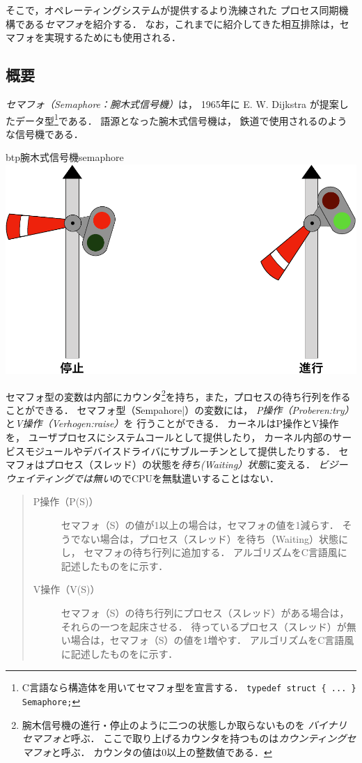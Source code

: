そこで，オペレーティングシステムが提供するより洗練された
プロセス同期機構である\emph{セマフォ}を紹介する．
なお，これまでに紹介してきた相互排除は，セマフォを実現するためにも使用される．

\subsection{概要}
\emph{セマフォ（Semaphore：腕木式信号機）}は，
1965年に E. W. Dijkstra が提案したデータ型\footnote{
  C言語なら構造体を用いてセマフォ型を宣言する．
  \texttt{typedef struct \{ ... \} Semaphore;}
}である．
語源となった腕木式信号機は，
鉄道で使用されるのような信号機である．

\begin{myfig}{btp}{腕木式信号機}{semaphore}
  \includegraphics[scale=0.4]{Fig/semaphore-crop.pdf}
\end{myfig}

セマフォ型の変数は内部にカウンタ\footnote{
  腕木信号機の進行・停止のように二つの状態しか取らないものを
  \emph{バイナリセマフォと}呼ぶ．
  ここで取り上げるカウンタを持つものは\emph{カウンティングセマフォ}と呼ぶ．
  カウンタの値は0以上の整数値である．
}を持ち，また，プロセスの待ち行列を作ることができる．
セマフォ型（\|Sempahore|）の変数には，
\emph{P操作（Proberen:try）}と\emph{V操作（Verhogen:raise）}を
行うことができる．
カーネルはP操作とV操作を，
ユーザプロセスにシステムコールとして提供したり，
カーネル内部のサービスモジュールやデバイスドライバにサブルーチンとして提供したりする．
セマフォはプロセス（スレッド）の状態を\emph{待ち(Waiting）状態}に変える．
  \emph{ビジーウェイティングでは無い}のでCPUを無駄遣いすることはない．

\begin{quote}
  \begin{description}
  \item[P操作（P(S)）]
    セマフォ（S）の値が1以上の場合は，セマフォの値を1減らす．
    そうでない場合は，プロセス（スレッド）を待ち（Waiting）状態にし，
    セマフォの待ち行列に追加する．
    アルゴリズムをC言語風に記述したものをに示す．
  \item[V操作（V(S)）]
    セマフォ（S）の待ち行列にプロセス（スレッド）がある場合は，
    それらの一つを起床させる．
    待っているプロセス（スレッド）が無い場合は，セマフォ（S）の値を1増やす．
    アルゴリズムをC言語風に記述したものをに示す．
  \end{description}
\end{quote}

